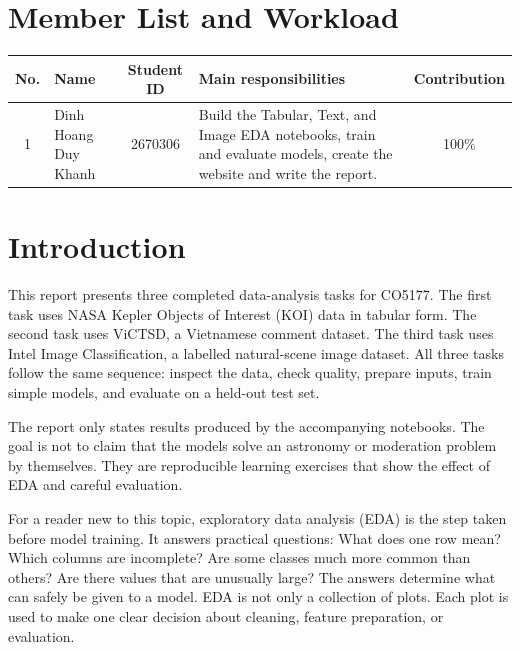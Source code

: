 \documentclass[oneside]{hcmut-report}
\begin{document}
\section*{Member List and Workload}
\begin{center}
\begin{table}[H]
\centering
\small
\begin{tabular}{|c|l|c|p{5.2cm}|c|}
\hline
\textbf{No.} & \textbf{Name} & \textbf{Student ID} & \textbf{Main responsibilities} & \textbf{Contribution} \\
\hline
1 & Dinh Hoang Duy Khanh & 2670306 &
Build the Tabular, Text, and Image EDA notebooks, train and evaluate models, create the website and write the report. & 100\% \\
\hline
\end{tabular}
\end{table}
\end{center}
\clearpage

\begingroup
\footnotesize
\tableofcontents
\endgroup
\clearpage

\section*{Introduction}

This report presents three completed data-analysis tasks for CO5177. The first task uses NASA Kepler Objects of Interest (KOI) data in tabular form. The second task uses ViCTSD, a Vietnamese comment dataset. The third task uses Intel Image Classification, a labelled natural-scene image dataset. All three tasks follow the same sequence: inspect the data, check quality, prepare inputs, train simple models, and evaluate on a held-out test set.

The report only states results produced by the accompanying notebooks. The goal is not to claim that the models solve an astronomy or moderation problem by themselves. They are reproducible learning exercises that show the effect of EDA and careful evaluation.

For a reader new to this topic, exploratory data analysis (EDA) is the step taken before model training. It answers practical questions: What does one row mean? Which columns are incomplete? Are some classes much more common than others? Are there values that are unusually large? The answers determine what can safely be given to a model. EDA is not only a collection of plots. Each plot is used to make one clear decision about cleaning, feature preparation, or evaluation.
\end{document}
